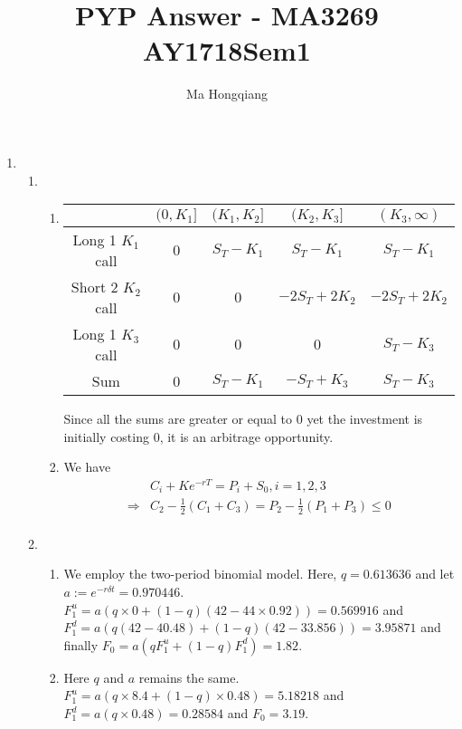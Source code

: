 \documentclass[12pt]{article}
\theoremstyle{definition}
\begin{document}
\title{PYP Answer - MA3269 AY1718Sem1}
\author{Ma Hongqiang}
\maketitle
\begin{enumerate}
  \item \begin{enumerate}%
    \item \begin{enumerate}%
      \item \begin{table}[h]
      \centering
      \begin{tabular}{c|c|c|c|c}
      & $(0,K_1]$ & $(K_1, K_2]$ & $(K_2,K_3]$&$(K_3, \infty)$\\\hline
      Long 1 $K_1$ call& $0$&$S_T-K_1$&$S_T-K_1$&$S_T-K_1$\\\hline
      Short 2 $K_2$ call & $0$ & $0$ & $-2S_T+2K_2$ &$-2S_T+2K_2$\\\hline
      Long 1 $K_3$ call &$0$&$0$&$0$&$S_T-K_3$\\\hline
      Sum&0&$S_T-K_1$&$-S_T+K_3$&$S_T-K_3$
      \end{tabular}
      \end{table}
      Since all the sums are greater or equal to $0$ yet the investment is initially costing $0$, it is an arbitrage opportunity.
      \item We have
      \begin{align*}
      &C_i+Ke^{-rT}=P_i+S_0, i = 1,2,3\\
\Rightarrow& C_2-\frac{1}{2}(C_1+C_3) = P_2-\frac{1}{2}(P_1+P_3)\leq 0\\
      \end{align*}
    \end{enumerate}
    \item \begin{enumerate}%
      \item We employ the two-period binomial model. Here,  $q=0.613636$ and let $a:=e^{-r\delta t}=0.970446$. $F_1^u=a(q\times 0+(1-q)(42-44\times 0.92))=0.569916$ and $F_1^d=a(q(42-40.48)+(1-q)(42-33.856))=3.95871$ and finally $F_0 = a(qF_1^u+(1-q)F_1^d)=1.82$.
      \item Here $q$ and $a$ remains the same. $F_1^u = a(q\times 8.4+(1-q)\times 0.48)=5.18218$ and $F_1^d=a(q\times 0.48)=0.28584$ and $F_0 = 3.19$.
    \end{enumerate}
  \end{enumerate}

\end{enumerate}
\end{document}
